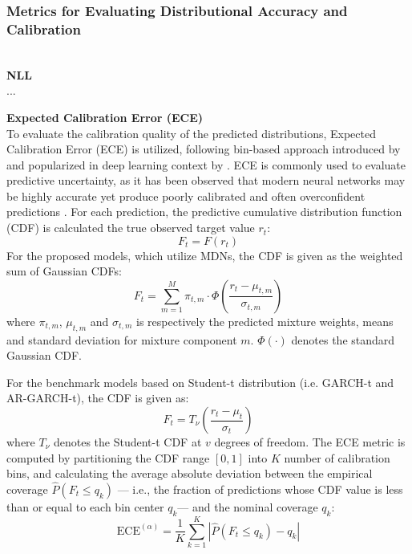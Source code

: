 \subsubsection{Metrics for Evaluating Distributional Accuracy and Calibration} \\
\textbf{NLL} \\
...


\textbf{Expected Calibration Error (ECE)} \\
To evaluate the calibration quality of the predicted distributions, Expected Calibration Error (ECE) is utilized, following bin-based approach introduced by \textcite{naeini2015} and popularized in deep learning context by \textcite{guo2017}. ECE is commonly used to evaluate predictive uncertainty, as it has been observed that modern neural networks may be highly accurate yet produce poorly calibrated and often overconfident predictions \parencite{guo2017, Nixon2017}. For each prediction, the predictive cumulative distribution function (CDF) is calculated the true observed target value $r_t$:
\begin{equation}
    F_t = F(r_t)
\end{equation}
For the proposed models, which utilize MDNs, the CDF is given as the weighted sum of Gaussian CDFs:
\begin{equation}
    F_t = \sum_{m=1}^{M} \pi_{t,m} \cdot \Phi\left( \frac{r_t - \mu_{t,m}}{\sigma_{t,m}} \right)
\end{equation}
where $\pi_{t,m}$, $\mu_{t,m}$ and $\sigma_{t,m}$ is respectively the predicted mixture weights, means and standard deviation for mixture component $m$. $\Phi(\cdot)$ denotes the standard Gaussian CDF. 

For the benchmark models based on Student-t distribution (i.e. GARCH-t and AR-GARCH-t), the CDF is given as: 
\begin{equation}
    F_t = T_{\nu} \left( \frac{r_t - \mu_t}{\sigma_t} \right)
\end{equation}
where $T_{\nu}$ denotes the Student-t CDF at $v$ degrees of freedom.
The ECE metric is  computed by partitioning the CDF range $[0, 1]$ into $K$ number of calibration bins, and calculating the average absolute deviation between the empirical coverage $\hat{P}(F_t \leq q_k)$ — i.e., the fraction of predictions whose CDF value is less than or equal to each bin center $q_k$— and the nominal coverage $q_k$:
\begin{equation}
    \text{ECE}^{(\alpha)} = \frac{1}{K} \sum_{k=1}^{K} \left| \hat{P}(F_t \leq q_k) - q_k \right|
\end{equation}



